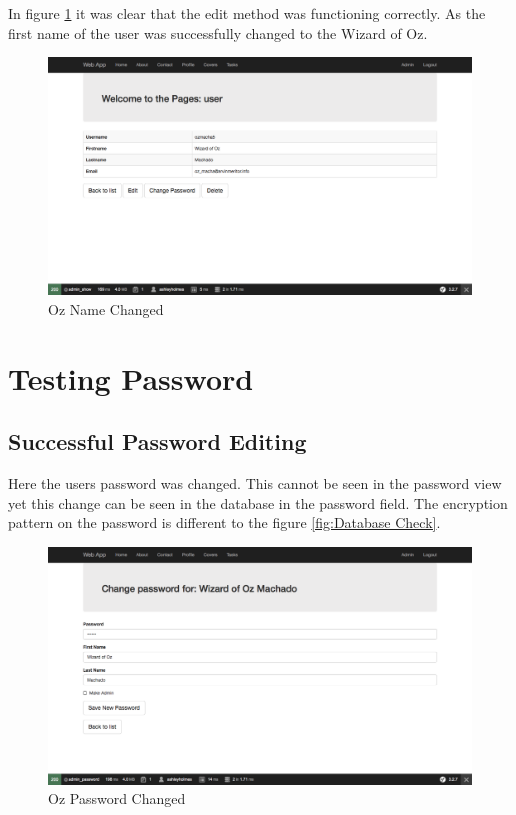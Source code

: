 In figure \ref{fig:Oz Name Changed} it was clear that the edit method was functioning correctly. As the first name of the user was successfully changed to the Wizard of Oz. 

\begin{figure}[htbp]
   \centering
   \includegraphics[width=400pt]{figures/wizard_oz.png} %
   \caption{Oz Name Changed}
   \label{fig:Oz Name Changed}
\end{figure}


\section{Testing Password}

\subsection{Successful Password Editing}

Here the users password was changed. This cannot be seen in the password view yet this change can be seen in the database in the password field. The encryption pattern on the password is different to the figure \ref{fig:Database Check}.

\begin{figure}[htbp]
   \centering
   \includegraphics[width=400pt]{figures/oz_change_password.png} %
   \caption{Oz Password Changed}
   \label{fig:Oz Password Changed}
\end{figure}

